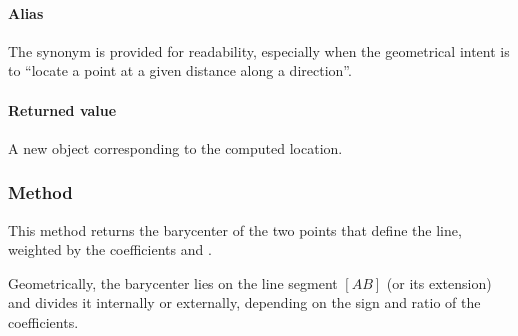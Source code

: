 \paragraph*{Alias}
The synonym  is provided for readability, especially when the geometrical intent is to “locate a point at a given distance along a direction”.

\paragraph*{Returned value}
A new  object corresponding to the computed location.


\vspace{1em}
\begin{tkzexample}[latex=.5\textwidth]
\begin{center}
\end{center}
\end{tkzexample}

\subsubsection{Method } %
\label{ssub:barycenter_with_a_line}

This method returns the barycenter of the two points that define the line, weighted by the coefficients  and .

\medskip
\noindent
Geometrically, the barycenter lies on the line segment $[AB]$ (or its extension) and divides it internally or externally, depending on the sign and ratio of the coefficients.


\begin{tkzexample}[latex=.5\textwidth]
\begin{center}
\end{center}
\end{tkzexample}

